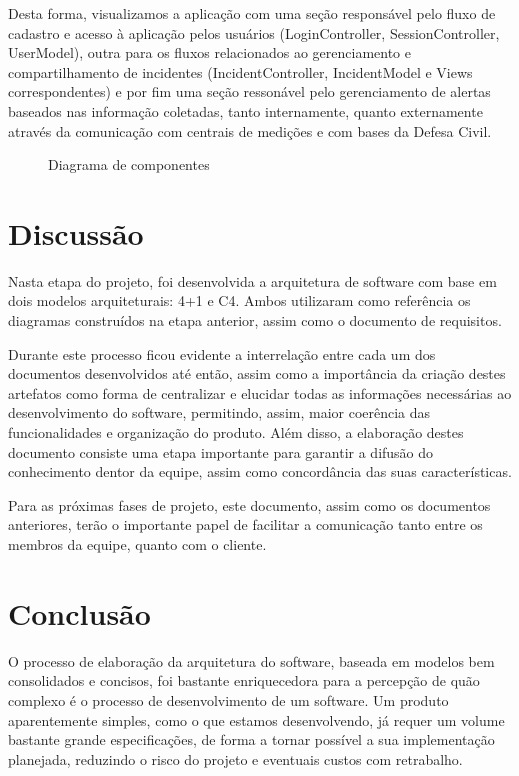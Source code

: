 \documentclass[12pt]{article}
\begin{document}
Desta forma, visualizamos a aplicação com uma seção responsável pelo fluxo de cadastro e acesso à aplicação pelos usuários (LoginController, SessionController, UserModel), outra para os fluxos relacionados ao gerenciamento e compartilhamento de incidentes (IncidentController, IncidentModel e Views correspondentes) e por fim uma seção ressonável pelo gerenciamento de alertas baseados nas informação coletadas, tanto internamente, quanto externamente através da comunicação com centrais de medições e com bases da Defesa Civil.


\begin{figure}[!h]
    \caption{\label{fig:diagC4Components} Diagrama de componentes}
\end{figure}
\vfill%

\pagebreak%

\section{Discussão}
Nasta etapa do projeto, foi desenvolvida a arquitetura de software com base em dois modelos arquiteturais: 4+1 e C4. Ambos utilizaram como referência os diagramas construídos na etapa anterior, assim como o documento de requisitos.

Durante este processo ficou evidente a interrelação entre cada um dos documentos desenvolvidos até então, assim como a importância da criação destes artefatos como forma de centralizar e elucidar todas as informações necessárias ao desenvolvimento do software, permitindo, assim, maior coerência das funcionalidades e organização do produto. Além disso, a elaboração destes documento consiste uma etapa importante para garantir a difusão do conhecimento dentor da equipe, assim como concordância das suas características.

Para as próximas fases de projeto, este documento, assim como os documentos anteriores, terão o importante papel de facilitar a comunicação tanto entre os membros da equipe, quanto com o cliente.

\section{Conclusão}
O processo de elaboração da arquitetura do software, baseada em modelos bem consolidados e concisos, foi bastante enriquecedora para a percepção de quão complexo é o processo de desenvolvimento de um software. Um produto aparentemente simples, como o que estamos desenvolvendo, já requer um volume bastante grande especificações, de forma a tornar possível a sua implementação planejada, reduzindo o risco do projeto e eventuais custos com retrabalho.
\end{document}
